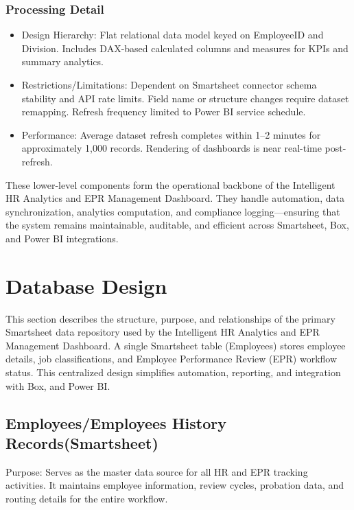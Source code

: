 \documentclass[12pt]{article}
\def\textbf#1{#1}%
\def\&{ and }%
\begin{document}
\subsubsection{Processing Detail}
\begin{itemize}[nosep]
  \item \textbf{Design Hierarchy:} Flat relational data model keyed on EmployeeID and Division. Includes DAX-based calculated columns and measures for KPIs and summary analytics.
  \item \textbf{Restrictions/Limitations:} Dependent on Smartsheet connector schema stability and API rate limits. Field name or structure changes require dataset remapping. Refresh frequency limited to Power BI service schedule.
  \item \textbf{Performance:} Average dataset refresh completes within 1–2 minutes for approximately 1,000 records. Rendering of dashboards is near real-time post-refresh.
\end{itemize}

\noindent
These lower-level components form the operational backbone of the Intelligent HR Analytics \& EPR Management Dashboard.  
They handle automation, data synchronization, analytics computation, and compliance logging—ensuring that the system remains maintainable, auditable, and efficient across Smartsheet, Box, and Power BI integrations.


\section{Database Design}

This section describes the structure, purpose, and relationships of the primary Smartsheet data repository used by the Intelligent HR Analytics \& EPR Management Dashboard.  
A single Smartsheet table (Employees) stores employee details, job classifications, and Employee Performance Review (EPR) workflow status. This centralized design simplifies automation, reporting, and integration with Box, and Power BI.

\subsection{Employees/Employees  History Records(Smartsheet)}
\textbf{Purpose:}  
Serves as the master data source for all HR and EPR tracking activities. It maintains employee information, review cycles, probation data, and routing details for the entire workflow.
\end{document}
